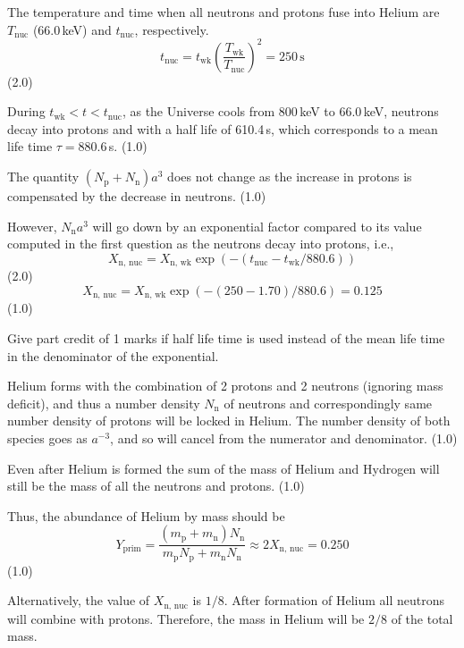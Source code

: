 \begin{description}
  The temperature and time when all neutrons and protons fuse into
  Helium are $T_{\mathrm{nuc}}$ (66.0\,keV) and $t_{\mathrm{nuc}}$,
  respectively.
  \[ t_{\mathrm{nuc}} = t_{\mathrm{wk}}
     \left(\frac{T_{\mathrm{wk}}}{T_{\mathrm{nuc}}}\right)^2
     = 250\,\mathrm{s} \]
  \hfill(2.0)

\item[(T10.4)] During $t_{\mathrm{wk}} < t < t_{\mathrm{nuc}}$, as the
  Universe cools from 800\,keV to 66.0\,keV, neutrons decay into protons
  and with a half life of 610.4\,s, which corresponds to a mean life time
  $\tau = 880.6$\,s. \hfill(1.0)

  The quantity $(N_{\mathrm{p}} + N_{\mathrm{n}})a^3$ does not change as
  the increase in protons is compensated by the decrease in neutrons.
  \hfill(1.0)

  However, $N_{\mathrm{n}}a^3$ will go down by an exponential factor
  compared to its value computed in the first question as the neutrons
  decay into protons, i.e.,
  \[ X_{\mathrm{n,\,nuc}} = X_{\mathrm{n,\,wk}}
     \exp(-(t_{\mathrm{nuc}} - t_{\mathrm{wk}}/880.6)) \]
  \hfill(2.0)
  \[ X_{\mathrm{n,\,nuc}} = X_{\mathrm{n,\,wk}}
     \exp(-(250 - 1.70)/880.6) = 0.125 \]
  \hfill(1.0)

  Give part credit of 1 marks if half life time is used instead of the
  mean life time in the denominator of the exponential.

\item[(T10.5)] Helium forms with the combination of 2 protons and 2
  neutrons (ignoring mass deficit), and thus a number density
  $N_{\mathrm{n}}$ of neutrons and correspondingly same number density of
  protons will be locked in Helium. The number density of both species
  goes as $a^{-3}$, and so will cancel from the numerator and
  denominator. \hfill(1.0)

  Even after Helium is formed the sum of the mass of Helium and Hydrogen
  will still be the mass of all the neutrons and protons. \hfill(1.0)

  Thus, the abundance of Helium by mass should be
  \[ Y_{\mathrm{prim}}
     = \frac{(m_{\mathrm{p}} + m_{\mathrm{n}})N_{\mathrm{n}}}
            {m_{\mathrm{p}}N_{\mathrm{p}} + m_{\mathrm{n}}N_{\mathrm{n}}}
     \approx 2X_{\mathrm{n,\,nuc}} = 0.250 \]
  \hfill(1.0)

  Alternatively, the value of $X_{\mathrm{n,\,nuc}}$ is $1/8$. After
  formation of Helium all neutrons will combine with protons. Therefore,
  the mass in Helium will be $2/8$ of the total mass.


\end{description}
